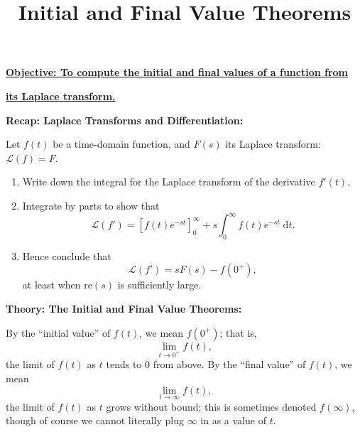 \documentclass{article}
\newcommand{\diff}{\;\mathrm{d}}
\begin{document}
\title{Initial and Final Value Theorems}
\date{}

\maketitle
\thispagestyle{empty}

\Large

\vskip -10mm

\textbf{\underline{Objective: To compute the initial and final values of a function from}}

\textbf{\underline{its Laplace transform.}}








\vspace{5mm}





\textbf{Recap: Laplace Transforms and Differentiation:}\bigskip

Let $f(t)$ be a time-domain function, and $F(s)$ its Laplace transform: $\mathcal{L}(f)=F$.

\begin{enumerate}
	\item Write down the integral for the Laplace transform of the derivative $f'(t)$.
	\item Integrate by parts to show that
		\[\mathcal{L}(f')=\left[f(t)e^{-st}\right]_0^\infty + s\int_0^\infty f(t)e^{-st}\diff t.\]
	\item Hence conclude that
		\[\mathcal{L}(f')=sF(s)-f(0^+),\]
		at least when $\mathrm{re}(s)$ is sufficiently large.
\end{enumerate}













\clearpage





\textbf{Theory: The Initial and Final Value Theorems:}\bigskip

By the ``initial value'' of $f(t)$, we mean $f(0^+)$; that is,
\[\lim_{t\to 0^+} f(t),\]
the limit of $f(t)$ as $t$ tends to 0 from above. By the ``final value'' of $f(t)$, we mean
\[\lim_{t\to \infty} f(t),\]
the limit of $f(t)$ as $t$ grows without bound; this is sometimes denoted $f(\infty)$, though of course we cannot literally plug $\infty$ in as a value of $t$.
\end{document}
